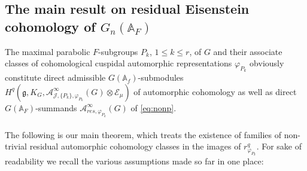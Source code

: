 \documentclass[a4paper,10pt]{amsart}
\theoremstyle{definition}
\numberwithin{equation}{section}
\def\A{\mathbb A}
\def\EE{\mathcal E}
\def\g{\mathfrak g}
\begin{document}
\subsection{The main result on residual Eisenstein cohomology of $G_n(\A_F)$}
The maximal parabolic $F$-subgroups $P_k$, $1\leq k\leq r$, of $G$ and their associate classes of cohomological cuspidal automorphic representations $\varphi_{P_k}$ obviously constitute direct admissible $G(\A_f)$-submodules $H^q(\g,K_G, \mathcal A^\infty_{\mathcal J,\{P_k\},\varphi_{P_k}}(G)\otimes\EE_\mu)$ of automorphic cohomology as well as direct $G(\A_F)$-summands $\mathcal A^\infty_{res,\varphi_{P_k}}(G)$ of \eqref{eq:nonp}.\\\\ The following is our main theorem, which treats the existence of families of non-trivial residual automorphic cohomology classes in the images of $r^q_{\varphi_{P_k}}$. For sake of readability we recall the various assumptions made so far in one place:
\end{document}
